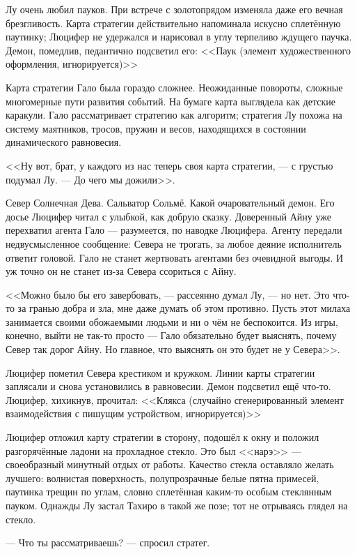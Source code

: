 Лу очень любил пауков.
При встрече с золотопрядом изменяла даже его вечная брезгливость.
Карта стратегии действительно напоминала искусно сплетённую паутинку;
Люцифер не удержался и нарисовал в углу терпеливо ждущего паучка.
Демон, помедлив, педантично подсветил его:
<<Паук (элемент художественного оформления, игнорируется)>>

Карта стратегии Гало была гораздо сложнее.
Неожиданные повороты, сложные многомерные пути развития событий.
На бумаге карта выглядела как детские каракули.
Гало рассматривает стратегию как алгоритм;
стратегия Лу похожа на систему маятников, тросов, пружин и весов, находящихся в состоянии динамического равновесия.

<<Ну вот, брат, у каждого из нас теперь своя карта стратегии, --- с грустью подумал Лу.
--- До чего мы дожили>>.

Север Солнечная Дева.
Сальватор Сольмё.
Какой очаровательный демон.
Его досье Люцифер читал с улыбкой, как добрую сказку.
Доверенный Айну уже перехватил агента Гало --- разумеется, по наводке Люцифера.
Агенту передали недвусмысленное сообщение: Севера не трогать, за любое деяние исполнитель ответит головой.
Гало не станет жертвовать агентами без очевидной выгоды.
И уж точно он не станет из-за Севера ссориться с Айну.

<<Можно было бы его завербовать, --- рассеянно думал Лу, --- но нет.
Это что-то за гранью добра и зла, мне даже думать об этом противно.
Пусть этот милаха занимается своими обожаемыми людьми и ни о чём не беспокоится.
Из игры, конечно, выйти не так-то просто --- Гало обязательно будет выяснять, почему Север так дорог Айну.
Но главное, что выяснять он это будет не у Севера>>.

Люцифер пометил Севера крестиком и кружком.
Линии карты стратегии заплясали и снова установились в равновесии.
Демон подсветил ещё что-то.
Люцифер, хихикнув, прочитал:
<<Клякса (случайно сгенерированный элемент взаимодействия с пишущим устройством, игнорируется)>>

Люцифер отложил карту стратегии в сторону, подошёл к окну и положил разгорячённые ладони на прохладное стекло.
Это был <<нарэ>> --- своеобразный минутный отдых от работы.
Качество стекла оставляло желать лучшего: волнистая поверхность, полупрозрачные белые пятна примесей, паутинка трещин по углам, словно сплетённая каким-то особым стеклянным пауком.
Однажды Лу застал Тахиро в такой же позе;
тот не отрываясь глядел на стекло.

--- Что ты рассматриваешь? --- спросил стратег.

